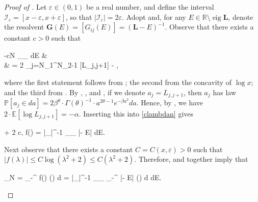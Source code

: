 \documentclass{amsart}
\numberwithin{equation}{section}
\DeclareMathOperator{\eig}{eig}
\theoremstyle{remark}
\theoremstyle{definition}
\begin{document}
	
	\begin{proof}[Proof of ]
		
		Let $\varepsilon \in (0, 1)$ be a real number, and define the interval $\mathcal{I}_{\varepsilon} = [x-\varepsilon, x + \varepsilon]$, so that $|\mathcal{I}_{\varepsilon}| = 2 \varepsilon$. Adopt  and, for any $E \in \mathbb{R} \setminus \eig \bm{L}$, denote the resolvent $\bm{G} (E) = [ G_{ij} (E) ] = (\bm{L}-E)^{-1}$. Observe that there exists a constant $c > 0$ such that 
		\begin{flalign}
			\label{clambdan}
			\begin{aligned} 
				-cN  \ge \displaystyle{} \displaystyle\int_{_{\varepsilon}} \log {} \big[ | G_{N_1 N_2} (E) |^{1/2} \big] dE & \ge {}  \\
				& = 2 \displaystyle\sum_{j=N_1}^{N_2-1}  [\log L_{j,j+1}] -   \Bigg[ \displaystyle\sum_{j=1}^N \displaystyle\frac{2}{|\mathcal{I}_{\varepsilon}|} \displaystyle\int_{\mathcal{I}_{\varepsilon}} \log |\lambda_i - E| dE \Bigg],
			\end{aligned}
		\end{flalign}
		
		\noindent where the first statement follows from ; the second from the concavity of $\log x$; and the third from . By , , and , if we denote $a_j = L_{j,j+1}$, then $a_j$ has law $\mathbb{P} [a_j \in da] = 2 \beta^{\theta} \cdot \Gamma (\theta)^{-1} \cdot a^{2\theta-1} e^{-\beta a^2} da$. Hence, by , we have $2 \cdot \mathbb{E} [\log L_{j,j+1}] = -\alpha$. Inserting this into \eqref{clambdan} gives
		\begin{flalign}
			\label{alphaf} 
			\alpha + 2 \cdot {} \Bigg[  \displaystyle\frac{1}{N} \displaystyle\sum_{j=1}^N f(\lambda_j) \Bigg] \ge c, \qquad {} \qquad f(\lambda) = |_{\varepsilon}|^{-1} \displaystyle\int_{_{\varepsilon}} \log |\lambda - E| dE.
		\end{flalign}
		
		Next observe that there exists a constant $C = C (x, \varepsilon) > 0$ such that $|f(\lambda)| \le C \log (\lambda^2 + 2) \le C(\lambda^2 + 2)$. Therefore,  and  together imply that 
		\begin{flalign*}
			\displaystyle\lim_{N \rightarrow \infty}  \Bigg[ \displaystyle\frac{1}{N} \displaystyle\sum_{j=1}^N f(\lambda_j) \Bigg] = \displaystyle\int_{-\infty}^{\infty} f(\lambda) \varrho (\lambda) d \lambda = |_{\varepsilon}|^{-1} \displaystyle\int_{_{\varepsilon}} \displaystyle\int_{-\infty}^{\infty} \log |\lambda - E| \varrho (\lambda) d \lambda dE.
		\end{flalign*} 
		

\end{proof}
\end{document}
